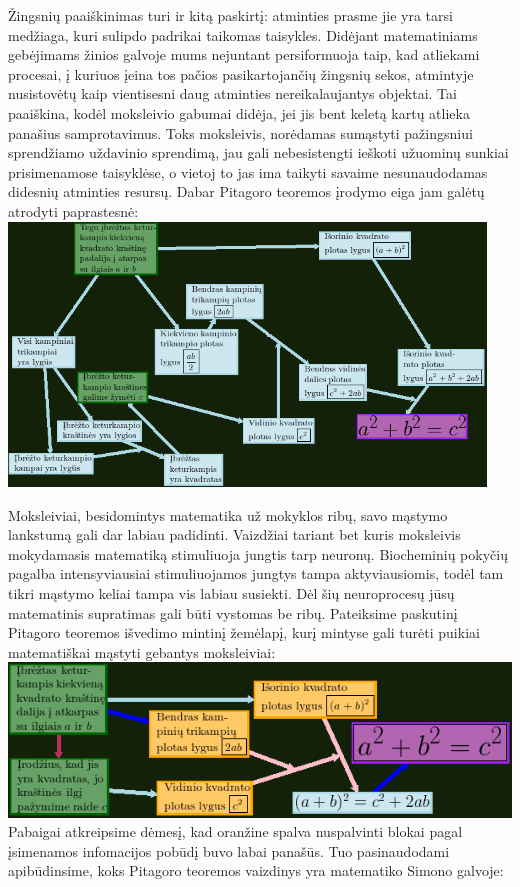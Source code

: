 \documentclass{article}
\begin{document}
Žingsnių paaiškinimas turi ir kitą paskirtį: atminties prasme jie yra tarsi medžiaga, kuri sulipdo padrikai taikomas taisykles.
Didėjant matematiniams gebėjimams žinios galvoje mums nejuntant persiformuoja taip, kad atliekami procesai, į kuriuos įeina tos pačios pasikartojančių žingsnių sekos, atmintyje nusistovėtų kaip vientisesni daug atminties nereikalaujantys objektai. Tai paaiškina, kodėl moksleivio gabumai didėja, jei jis bent keletą kartų atlieka panašius samprotavimus. Toks moksleivis, norėdamas sumąstyti pažingsniui sprendžiamo uždavinio sprendimą, jau gali nebesistengti ieškoti užuominų sunkiai prisimenamose taisyklėse, o vietoj to jas ima taikyti savaime nesunaudodamas didesnių atminties resursų. Dabar Pitagoro teoremos įrodymo eiga jam galėtų atrodyti paprastesnė:
\newline
\newline
\noindent\includegraphics[width=0.95\textwidth]{pythagorian_restructure.png}

Moksleiviai, besidomintys matematika už mokyklos ribų, savo mąstymo lankstumą gali dar labiau padidinti. Vaizdžiai tariant bet kuris moksleivis mokydamasis matematiką stimuliuoja jungtis tarp neuronų. Biocheminių pokyčių pagalba intensyviausiai stimuliuojamos jungtys tampa aktyviausiomis, todėl tam tikri mąstymo keliai tampa vis labiau susiekti. Dėl šių neuroprocesų jūsų matematinis supratimas gali būti vystomas be ribų. Pateiksime paskutinį Pitagoro teoremos išvedimo mintinį žemėlapį, kurį mintyse gali turėti puikiai matematiškai mąstyti gebantys moksleiviai:
\newline
\newline
\noindent\includegraphics[width=\textwidth]{pythagorian_finalform.png}
Pabaigai atkreipsime dėmesį, kad oranžine spalva nuspalvinti blokai pagal įsimenamos infomacijos pobūdį buvo labai panašūs. Tuo pasinaudodami apibūdinsime, koks Pitagoro teoremos vaizdinys yra matematiko Simono galvoje:
\end{document}
